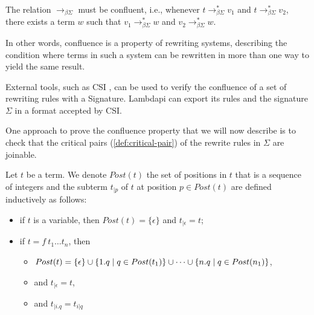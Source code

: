 \begin{definition}\label{def:confluence-rew}
The relation $\longrightarrow_{\beta\Sigma}$ must be confluent, i.e., whenever $t \longrightarrow_{\beta\Sigma}^* v_1$ and $t \longrightarrow_{\beta\Sigma}^* v_2$, there exists a term $w$ such that $v_1 \longrightarrow_{\beta\Sigma}^* w$ and $v_2 \longrightarrow_{\beta\Sigma}^* w$.

\begin{center}
\end{center}
\end{definition}

In other words, confluence is a property of rewriting systems, describing the condition where terms in such a system can be rewritten in more than one way to yield the same result.

\begin{remark}
External tools, such as CSI \cite{CSI}, can be used to verify the confluence of a set of rewriting rules with a Signature.
Lambdapi can export its rules and the signature $\Sigma$ in a format accepted by CSI.
\end{remark}

One approach to prove the confluence property that we will now describe is to check that the critical pairs (\cref{def:critical-pair}) of the rewrite rules in $\Sigma$ are joinable.

\begin{definition}
Let $t$ be a term. We denote $Post(t)$ the set of positions in $t$ that is a sequence of integers and the subterm $t_{| p}$ of $t$
at position $p \in Post(t)$ are defined inductively as follows:
\begin{itemize}
  \item if $t$ is a variable, then $Post(t) = \{ \epsilon \}$ and $t_{| \epsilon} = t$;
  \item if $t = f~t_1 \dots t_n$, then
    \begin{itemize}
      \item[] \( Post(t) = \{ \epsilon \} \cup \{1.q \mathrel{|} q \in Post(t_1)\} \cup \dots \cup \{n.q \mathrel{|} q \in Post(n_1)\} \),
      \item[] and \( t_{| \epsilon} = t \),
      \item[] and \( t_{| i.q} = t_{i|q} \)
    \end{itemize}
\end{itemize}
\end{definition}

